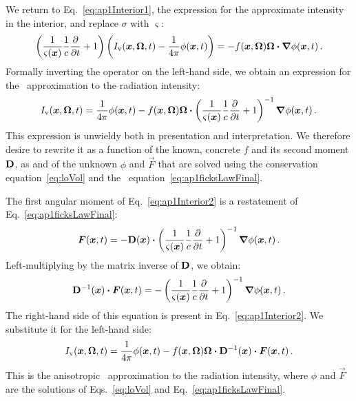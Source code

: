 We return to Eq.~\eqref{eq:ap1Interior1}, the expression for the approximate
intensity in the interior, and replace $\sigma$ with $\varsigma$:
\begin{equation*}
  \left( \frac{1}{\varsigma(\bm{x})} \frac{1}{c}\frac{\partial }{\partial t} + 1 \right)
  \left( I_\mathrm{v}(\bm{x},\bm{\Omega},t) - \frac{1}{4\pi} \phi(\bm{x},t) \right)
  = - f(\bm{x},\bm{\Omega}) \bm{\Omega}\bm{\cdot} \bm{\nabla} \phi(\bm{x}, t) \,.
\end{equation*}
Formally inverting the operator on the left-hand side, we obtain an expression
for the \APone\ approximation to the radiation intensity:
\begin{equation}\label{eq:ap1Interior2}
 I_\mathrm{v}(\bm{x},\bm{\Omega},t)
 =
 \frac{1}{4\pi} \phi(\bm{x},t)
 - f(\bm{x},\bm{\Omega}) \bm{\Omega} \bm{\cdot}
  \left( \frac{1}{\varsigma(\bm{x})} \frac{1}{c}\frac{\partial }{\partial t} + 1 \right)^{-1} 
  \bm{\nabla} \phi(\bm{x}, t) \,.
\end{equation}
This expression is unwieldy both in presentation and interpretation. We
therefore desire to rewrite it as a function of the known, concrete $f$ and its
second moment $\mathbf{D}$, as and of the unknown $\phi$ and $\vec{F}$ that are
solved using the conservation equation~\eqref{eq:loVol} and
the \APone\ equation~\eqref{eq:ap1ficksLawFinal}.

The first angular moment of Eq.~\eqref{eq:ap1Interior2} is a restatement of
Eq.~\eqref{eq:ap1ficksLawFinal}:
\begin{equation*}
  \bm{F}(\bm{x},t)
  =
 - \mathbf{D}(\bm{x}) \bm{\cdot}
 \left( \frac{1}{\varsigma(\bm{x})} \frac{1}{c}\frac{\partial }{\partial t} + 1 \right)^{-1}
 \bm{\nabla} \phi(\bm{x}, t) \,.
\end{equation*}
Left-multiplying by the matrix inverse of $\mathbf{D}$, we obtain:
\begin{equation*}
  \mathbf{D}^{-1}(\bm{x}) \bm{\cdot} \bm{F}(\bm{x},t)
  =
 - \left( \frac{1}{\varsigma(\bm{x})} \frac{1}{c}\frac{\partial }{\partial t} + 1 \right)^{-1}
 \bm{\nabla} \phi(\bm{x}, t) \,.
\end{equation*}
The right-hand side of this equation is present in Eq.~\eqref{eq:ap1Interior2}.
We substitute it for the left-hand side:
\begin{equation}\label{eq:ap1InteriorFinal}
 I_\mathrm{v}(\bm{x},\bm{\Omega},t)
 =
 \frac{1}{4\pi} \phi(\bm{x},t)
 - f(\bm{x},\bm{\Omega}) \bm{\Omega} \bm{\cdot}
  \mathbf{D}^{-1}(\bm{x}) \bm{\cdot} \bm{F}(\bm{x},t) \,.
\end{equation}
This is the anisotropic \Pone\ approximation to the radiation intensity, where
$\phi$ and $\vec{F}$ are the solutions of Eqs.~\eqref{eq:loVol} and
Eq.~\eqref{eq:ap1ficksLawFinal}.

